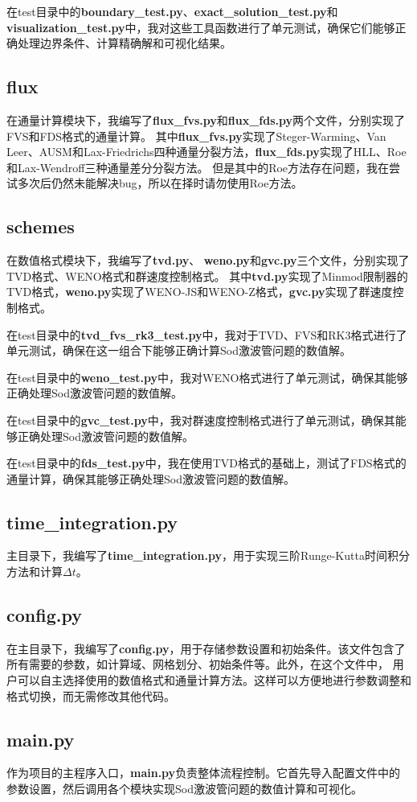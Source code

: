 \documentclass[UTF8]{ctexart}
\begin{document}
在test目录中的\textbf{boundary\_test.py}、\textbf{exact\_solution\_test.py}和\textbf{visualization\_test.py}中，我对这些工具函数进行了单元测试，确保它们能够正确处理边界条件、计算精确解和可视化结果。
\subsection{flux}
在通量计算模块下，我编写了\textbf{flux\_fvs.py}和\textbf{flux\_fds.py}两个文件，分别实现了FVS和FDS格式的通量计算。
其中\textbf{flux\_fvs.py}实现了Steger-Warming、Van Leer、AUSM和Lax-Friedrichs四种通量分裂方法，\textbf{flux\_fds.py}实现了HLL、Roe和Lax-Wendroff三种通量差分分裂方法。
但是其中的Roe方法存在问题，我在尝试多次后仍然未能解决bug，所以在择时请勿使用Roe方法。
\subsection{schemes}
在数值格式模块下，我编写了\textbf{tvd.py}、 \textbf{weno.py}和\textbf{gvc.py}三个文件，分别实现了TVD格式、WENO格式和群速度控制格式。
其中\textbf{tvd.py}实现了Minmod限制器的TVD格式，\textbf{weno.py}实现了WENO-JS和WENO-Z格式，\textbf{gvc.py}实现了群速度控制格式。

在test目录中的\textbf{tvd\_fvs\_rk3\_test.py}中，我对于TVD、FVS和RK3格式进行了单元测试，确保在这一组合下能够正确计算Sod激波管问题的数值解。

在test目录中的\textbf{weno\_test.py}中，我对WENO格式进行了单元测试，确保其能够正确处理Sod激波管问题的数值解。

在test目录中的\textbf{gvc\_test.py}中，我对群速度控制格式进行了单元测试，确保其能够正确处理Sod激波管问题的数值解。

在test目录中的\textbf{fds\_test.py}中，我在使用TVD格式的基础上，测试了FDS格式的通量计算，确保其能够正确处理Sod激波管问题的数值解。
\subsection{time\_integration.py}
主目录下，我编写了\textbf{time\_integration.py}，用于实现三阶Runge-Kutta时间积分方法和计算$\Delta t$。
\subsection{config.py}
在主目录下，我编写了\textbf{config.py}，用于存储参数设置和初始条件。该文件包含了所有需要的参数，如计算域、网格划分、初始条件等。此外，在这个文件中，
用户可以自主选择使用的数值格式和通量计算方法。这样可以方便地进行参数调整和格式切换，而无需修改其他代码。
\subsection{main.py}
作为项目的主程序入口，\textbf{main.py}负责整体流程控制。它首先导入配置文件中的参数设置，然后调用各个模块实现Sod激波管问题的数值计算和可视化。
\end{document}
